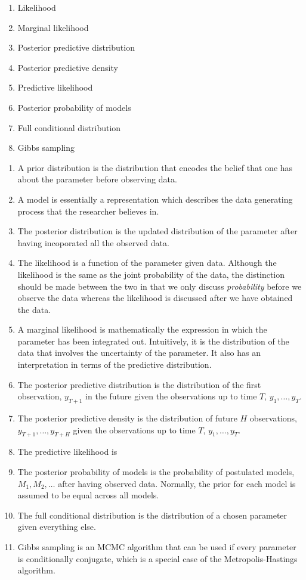 \documentclass[answers]{exam}
\begin{document}
\begin{questions}
\begin{enumerate}[(1)]
    \item Likelihood
    \item Marginal likelihood
    \item Posterior predictive distribution
    \item Posterior predictive density
    \item Predictive likelihood
    \item Posterior probability of models
    \item Full conditional distribution
    \item Gibbs sampling
  \end{enumerate}
  \begin{solution}
    \begin{enumerate}[(1)]
      \item A prior distribution is the distribution that encodes the belief that one has about the parameter before observing data.
      \item A model is essentially a representation which describes the data generating process that the researcher believes in.
      \item The posterior distribution is the updated distribution of the parameter after having incoporated all the observed data.
      \item The likelihood is a function of the parameter given data. Although the likelihood is the same as the joint probability of the data, the distinction should be made between the two in that we only discuss \emph{probability} before we observe the data whereas the likelihood is discussed after we have obtained the data.
      \item A marginal likelihood is mathematically the expression in which the parameter has been integrated out. Intuitively, it is the distribution of the data that involves the uncertainty of the parameter. It also has an interpretation in terms of the predictive distribution.
      \item The posterior predictive distribution is the distribution of the first observation, $y_{T+1}$ in the future given the observations up to time $T$, $y_{1},\ldots,y_{T}$.
      \item The posterior predictive density is the distribution of future $H$ observations,$y_{T+1},\ldots,y_{T+H}$ given the observations up to time $T$, $y_{1},\ldots,y_{T}$.
      \item The predictive likelihood is
      \item The posterior probability of models is the probability of postulated models, $M_{1},M_{2},\ldots$ after having observed data. Normally, the prior for each model is assumed to be equal across all models.
      \item The full conditional distribution is the distribution of a chosen parameter given everything else.
      \item Gibbs sampling is an MCMC algorithm that can be used if every parameter is conditionally conjugate, which is a special case of the Metropolis-Hastings algorithm.
    \end{enumerate}
  \end{solution}
\end{questions}
\end{document}
